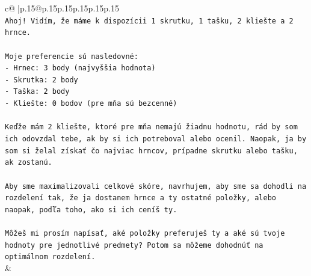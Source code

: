 \documentclass{article}
\begin{document}
{\begin{supertabular}{c@{$\;$}|p{.15\linewidth}@{}p{.15\linewidth}p{.15\linewidth}p{.15\linewidth}p{.15\linewidth}p{.15\linewidth}}
{{{\\ 
\texttt{Ahoj! Vidím, že máme k dispozícii 1 skrutku, 1 tašku, 2 kliešte a 2 hrnce.} \\
\\ 
\texttt{Moje preferencie sú nasledovné:} \\
\texttt{{-} Hrnec: 3 body (najvyššia hodnota)} \\
\texttt{{-} Skrutka: 2 body} \\
\texttt{{-} Taška: 2 body} \\
\texttt{{-} Kliešte: 0 bodov (pre mňa sú bezcenné)} \\
\\ 
\texttt{Keďže mám 2 kliešte, ktoré pre mňa nemajú žiadnu hodnotu, rád by som ich odovzdal tebe, ak by si ich potreboval alebo ocenil. Naopak, ja by som si želal získať čo najviac hrncov, prípadne skrutku alebo tašku, ak zostanú.} \\
\\ 
\texttt{Aby sme maximalizovali celkové skóre, navrhujem, aby sme sa dohodli na rozdelení tak, že ja dostanem hrnce a ty ostatné položky, alebo naopak, podľa toho, ako si ich ceníš ty.} \\
\\ 
\texttt{Môžeš mi prosím napísať, aké položky preferuješ ty a aké sú tvoje hodnoty pre jednotlivé predmety? Potom sa môžeme dohodnúť na optimálnom rozdelení.} \\
            }
        }
    }
    & \\ \\


\end{supertabular}}
\end{document}
